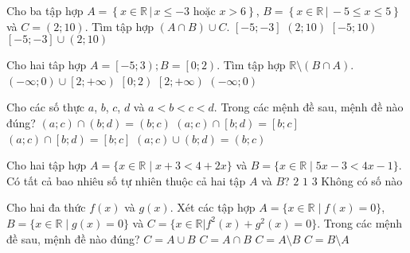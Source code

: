 \begin{ex}%
	Cho ba tập hợp $A = \left\{x \in \mathbb{R} \,|\, x \leq -3 \,\, \text{hoặc}\,\, x > 6\right\}$, $B = \left\{x \in \mathbb{R} \,|\,-5 \leq x \leq 5\right\}$ và $C = \left(2; 10 \right)$. Tìm tập hợp $\left(A \cap B\right)\cup C$.
	\choice
	{$\left[-5; -3\right]$}
	{$\left(2; 10\right)$}
	{$\left[-5; 10\right)$}
	{\True $\left[-5; -3\right] \cup \left(2; 10\right)$}
	\loigiai{Ta có $A = \left(-\infty; -3\right] \cup \left(6; +\infty\right)$ và $B = \left[-5; 5\right]$\\
		Do đó $A \cap B = \left[-5; -3\right]$. Vậy $\left(A \cap B\right)\cup C = \left[-5; -3\right] \cup \left(2; 10\right)$}
\end{ex}

\begin{ex}%
	Cho hai tâp hợp $A = \left[-5; 3\right); B = \left[0; 2\right)$. Tìm tập hợp $\mathbb{R} \setminus \left( B \cap A\right)$.
	\choice
	{\True $\left(-\infty; 0\right) \cup \left[2; +\infty\right)$}
	{$\left[0; 2\right)$}
	{$\left[2; +\infty\right)$}
	{$\left(-\infty; 0\right)$}
	\loigiai{Do $A \cap B = \left[0; 2\right)$ nên $\mathbb{R} \setminus (A \cap B) = (-\infty; 0) \cup [2; +\infty)$}
\end{ex}
\begin{ex}%
	Cho các số thực $a$, $b$, $c$, $d$ và $a<b<c<d$. Trong các mệnh đề sau, mệnh đề nào đúng?
	\choice
	{\True$\left(a;c\right)\cap\left(b;d\right)=\left(b;c\right)$}
	{$\left(a;c\right)\cap\left[b;d\right)=\left[b;c\right]$}
	{$\left(a;c\right)\cap\left[b;d\right)=\left[b;c\right]$}
	{$\left(a;c\right)\cup\left(b;d\right)=\left(b;c\right)$}
\end{ex}
\begin{ex}%
	Cho hai tập hợp $A=\{x\in\mathbb{R}\;\big|\;x+3<4+2x\}$ và $B=\{x\in\mathbb{R}\;\big|\;5x-3<4x-1\}$. Có tất cả bao nhiêu số tự nhiên thuộc cả hai tập $A$ và $B$?
	\choice
	{\True $2$}
	{$1$}
	{$3$}
	{Không có số nào}
\end{ex}
\begin{ex}%
	Cho hai đa thức $f(x)$ và $g(x)$. Xét các tập hợp $A=\{x\in\mathbb{R}\;\big|\;f(x)=0\}$, $B=\{x\in\mathbb{R}\;\big|\;g(x)=0\}$ và $C=\{x\in\mathbb{R}|f^2(x)+g^2(x)=0\}$. Trong các mệnh đề sau, mệnh đề nào đúng?
	\choice
	{$C=A\cup B$}
	{\True $C=A\cap B$}
	{$C=A\setminus B$}
	{$C=B\setminus A$}
\end{ex}


